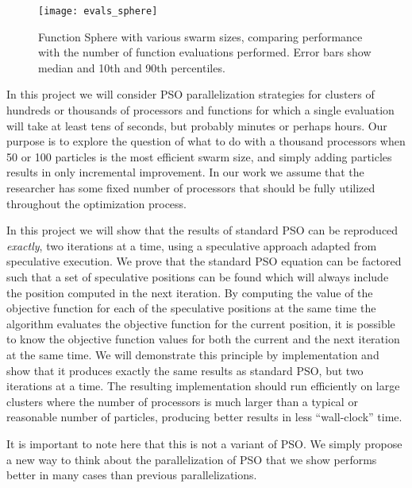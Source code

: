 \documentclass[ms]{byuprop}
\begin{document}
\begin{figure}
  \centering
  \texttt{[image: evals\_sphere]}
  \caption{Function Sphere with various swarm sizes, comparing performance with
  the number of function evaluations performed.  Error bars show median and
  10th and 90th percentiles.}
  \label{fig:evals-sphere}
\end{figure}

In this project we will consider PSO parallelization strategies for clusters of
hundreds or thousands of processors and functions for which a single evaluation
will take at least tens of seconds, but probably minutes or perhaps hours.  Our
purpose is to explore the question of what to do with a thousand processors
when 50 or 100 particles is the most efficient swarm size, and simply adding
particles results in only incremental improvement.  In our work we assume that
the researcher has some fixed number of processors that should be fully
utilized throughout the optimization process.

In this project we will show that the results of standard PSO can be reproduced
\emph{exactly}, two iterations at a time, using a speculative approach adapted
from speculative execution. We prove that the standard PSO equation can be
factored such that a set of speculative positions can be found which will
always include the position computed in the next iteration.  By computing the
value of the objective function for each of the speculative positions at the
same time the algorithm evaluates the objective function for the current
position, it is possible to know the objective function values for both the
current and the next iteration at the same time.  We will demonstrate this
principle by implementation and show that it produces exactly the same results
as standard PSO, but two iterations at a time.  The resulting implementation
should run efficiently on large clusters where the number of processors is much
larger than a typical or reasonable number of particles, producing better
results in less ``wall-clock'' time.

It is important to note here that this is not a variant of PSO.  We simply
propose a new way to think about the parallelization of PSO that we show
performs better in many cases than previous parallelizations.
\end{document}

